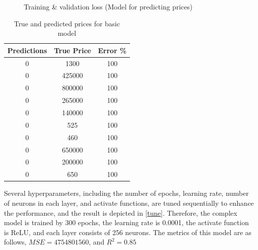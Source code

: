 \documentclass[12pt,twoside]{report}
\begin{document}
\begin{figure}[!htbp]
	\hfil
	\caption{Training \& validation loss (Model for predicting prices)}
	\label{all_complex_full_epoch_1000}
\end{figure}

\begin{table}[!htbp]
	\centering
	\caption{ True and predicted prices for basic model}
	\label{complex_model_prediction_price}
	\begin{tabular}{| c | c | c |}
		\hline
		Predictions & True Price & Error \% \\
		\hline
		0 & 1300 & 100 \\
		\hline
		0 & 425000 & 100 \\
		\hline
		0 & 800000 & 100 \\
		\hline
		0 & 265000 & 100 \\
		\hline
		0 & 140000 & 100 \\
		\hline
		0 & 525 & 100 \\
		\hline
		0 & 460 & 100 \\ 
		\hline
		0 & 650000 & 100 \\
		\hline
		0 & 200000 & 100 \\
		\hline
		0 & 650 & 100 \\
		\hline
	\end{tabular}
\end{table}

Several hyperparameters, including the number of epochs, learning rate, number of neurons in each layer, and activate functions, are tuned sequentially to enhance the performance, and the result is depicted in \ref{tune}. Therefore, the complex model is trained by 300 epochs, the learning rate is 0.0001, the activate function is ReLU, and each layer consists of 256 neurons. The metrics of this model are as follows, $MSE = 4754801560$, and $R^2 = 0.85$
\end{document}
